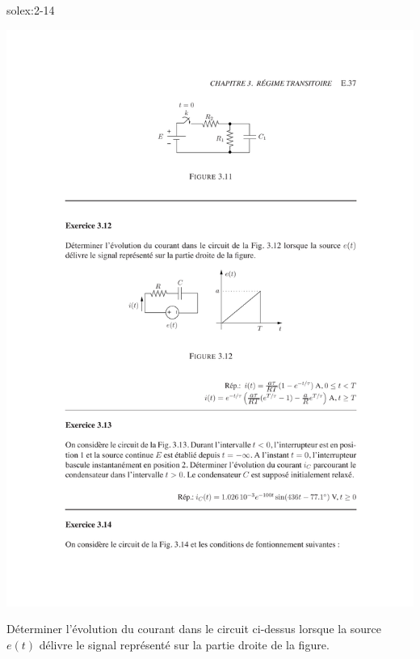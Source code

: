 \begin{exwithsol}{solex:2-14}
\begin{exercise}{}
	\label{ex:2-12}
\begin{center}
	\includegraphics[width=0.7\linewidth]{exercices/ex-3-12}
\end{center}
D\'eterminer l'\'evolution du courant dans le circuit ci-dessus
lorsque la source $e(t)$ d\'elivre le signal repr\'esent\'e sur la partie
droite de la figure. 

\end{exercise}



\end{exwithsol}
